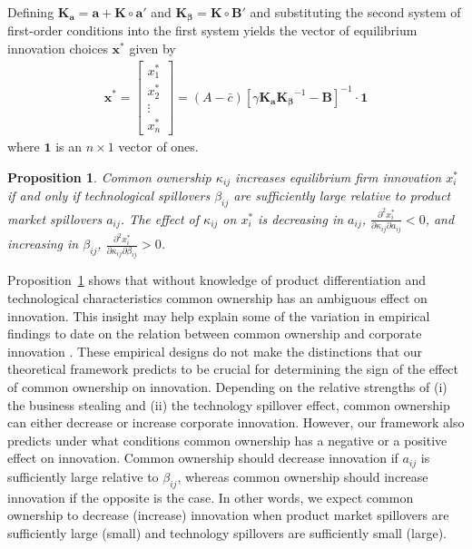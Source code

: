 \documentclass[12pt]{article}
\newtheorem{proposition}{Proposition}
\begin{document}
Defining $\mathbf{K_{a}} = \mathbf{a} + \mathbf{K} \circ \mathbf{a}'$ and $\mathbf{K_{\beta}} = \mathbf{K} \circ \mathbf{B}'$ and substituting the second system of first-order conditions into the first system yields the vector of equilibrium innovation choices $\mathbf{x^*}$ given by
\begin{align}
	\mathbf{x^*}
	= \begin{bmatrix} x^*_1\\x^*_2\\ \vdots \\ x^*_n \end{bmatrix}
	= (A-\bar{c})
	\left[
	\gamma \mathbf{K_a}\mathbf{K_\beta}^{-1}-\mathbf{B}\right]^{-1} \cdot \mathbf{1} \label{eq:equilibrium_innovation}
\end{align}
where $\mathbf{1}$ is an $n\times 1$ vector of ones.

\begin{proposition}\label{proposition_main}
Common ownership $\kappa_{ij}$ increases equilibrium firm innovation $x^{*}_{i}$ if and only if technological spillovers $\beta_{ij}$ are sufficiently large relative to product market spillovers $a_{ij}$. The effect of $\kappa_{ij}$ on $x_{i}^{*}$ is decreasing in $a_{ij}$, $\frac{\partial^2 x_{i}^{*}}{\partial \kappa_{ij} \partial a_{ij}} < 0$, and increasing in $\beta_{ij}$, $\frac{\partial^2 x_{i}^{*}}{\partial \kappa_{ij} \partial \beta_{ij}} > 0$.
\end{proposition}

Proposition~\ref{proposition_main} shows that without knowledge of product differentiation and technological characteristics common ownership has an ambiguous effect on innovation. This insight may help explain some of the variation in empirical findings to date on the relation between common ownership and corporate innovation \citep{kostovetsky2020common,borochin2020common,chiao2020corporate}. These empirical designs do not make the distinctions that our theoretical framework predicts to be crucial for determining the sign of the effect of common ownership on innovation. Depending on the relative strengths of (i) the business stealing and (ii) the technology spillover effect, common ownership can either decrease or increase corporate innovation. However, our framework also predicts under what conditions common ownership has a negative or a positive effect on innovation. Common ownership should decrease innovation if $a_{ij}$ is sufficiently large relative to $\beta_{ij}$, whereas common ownership should increase innovation if the opposite is the case. In other words, we expect common ownership to decrease (increase) innovation when product market spillovers are sufficiently large (small) and technology spillovers are sufficiently small (large).
\end{document}
